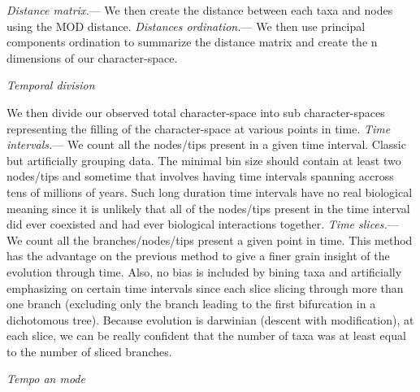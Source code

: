 \documentclass[12pt,letterpaper]{article}
\renewcommand{\subsection}[1]{%
\bigskip
\begin{center}
\begin{large}
\normalfont\itshape #1
\end{large}
\end{center}}
\renewcommand{\subsubsection}[1]{%
\vspace{2ex}
\noindent
\textit{#1.}---}
\begin{document}
\subsubsection{Distance matrix}
We then create the distance between each taxa and nodes using the MOD distance.
\subsubsection{Distances ordination}
We then use principal components ordination to summarize the distance matrix and create the n dimensions of our character-space.

\subsection{Temporal division}
We then divide our observed total character-space into sub character-spaces representing the filling of the character-space at various points in time.
\subsubsection{Time intervals}
We count all the nodes/tips present in a given time interval.
Classic but artificially grouping data. The minimal bin size should contain at least two nodes/tips and sometime that involves having time intervals spanning accross tens of millions of years. Such long duration time intervals have no real biological meaning since it is unlikely that all of the nodes/tips present in the time interval did ever coexisted and had ever biological interactions together.
\subsubsection{Time slices}
We count all the branches/nodes/tips present a given point in time. This method has the advantage on the previous method to give a finer grain insight of the evolution through time. Also, no bias is included by bining taxa and artificially emphasizing on certain time intervals since each slice slicing through more than one branch (excluding only the branch leading to the first bifurcation in a dichotomous tree). Because evolution is darwinian (descent with modification), at each slice, we can be really confident that the number of taxa was at least equal to the number of sliced branches.

\subsection{Tempo an mode}
\end{document}
